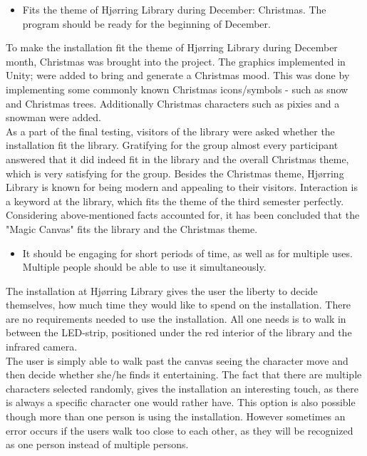 \begin{itemize}
\item Fits the theme of Hj{\o}rring Library during December: Christmas. The program should be ready for the beginning of December.
\end{itemize}
To make the installation fit the theme of Hj{\o}rring Library during December month, Christmas was brought into the project. The graphics implemented in Unity; were added to bring and generate a Christmas mood. This was done by implementing some commonly known Christmas icons/symbols - such as snow and Christmas trees. Additionally Christmas characters such as pixies and a snowman were added.\\
As a part of the final testing, visitors of the library were asked whether the installation fit the library. Gratifying for the group almost every participant answered that it did indeed fit in the library and the overall Christmas theme, which is very satisfying for the group. Besides the Christmas theme, Hj{\o}rring Library is known for being modern and appealing to their visitors. Interaction is a keyword at the library, which fits the theme of the third semester perfectly. Considering above-mentioned facts accounted for, it has been concluded that the "Magic Canvas" fits the library and the Christmas theme.


\begin{itemize}
\item It should be engaging for short periods of time, as well as for multiple uses. Multiple people should be able to use it simultaneously.
\end{itemize}
The installation at Hj{\o}rring Library gives the user the liberty to decide themselves, how much time they would like to spend on the installation. There are no requirements needed to use the installation. All one needs is to walk in between the LED-strip, positioned under the red interior of the library and the infrared camera.\\
The user is simply able to walk past the canvas seeing the character move and then decide whether she/he finds it entertaining. The fact that there are multiple characters selected randomly, gives the installation an interesting touch, as there is always a specific character one would rather have. This option is also possible though more than one person is using the installation. However sometimes an error occurs if the users walk too close to each other, as they will be recognized as one person instead of multiple persons.


